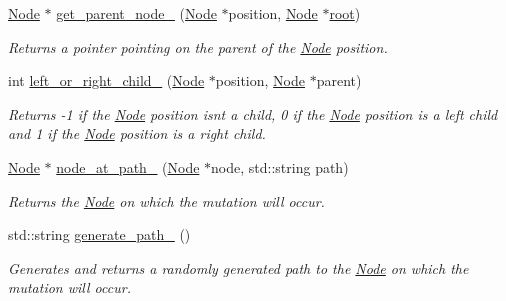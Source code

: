 \begin{DoxyCompactItemize}
\mbox{\label{classEvolution_ac22e226d32fe53774b437c51903816db}} 
\hyperlink{classNode}{Node} $\ast$ \hyperlink{classEvolution_ac22e226d32fe53774b437c51903816db}{get\+\_\+parent\+\_\+node\+\_\+} (\hyperlink{classNode}{Node} $\ast$position, \hyperlink{classNode}{Node} $\ast$\hyperlink{classEvolution_a83182c1db463268e933cc0ca9c46d056}{root})
\begin{DoxyCompactList}\small\item\em Returns a pointer pointing on the parent of the \hyperlink{classNode}{Node} position. \end{DoxyCompactList}\item 
\mbox{\label{classEvolution_a9d5f4998a7ec21ea2a2bec87b89d26ec}} 
int \hyperlink{classEvolution_a9d5f4998a7ec21ea2a2bec87b89d26ec}{left\+\_\+or\+\_\+right\+\_\+child\+\_\+} (\hyperlink{classNode}{Node} $\ast$position, \hyperlink{classNode}{Node} $\ast$parent)
\begin{DoxyCompactList}\small\item\em Returns -\/1 if the \hyperlink{classNode}{Node} position isn\textquotesingle{}t a child, 0 if the \hyperlink{classNode}{Node} position is a left child and 1 if the \hyperlink{classNode}{Node} position is a right child. \end{DoxyCompactList}\item 
\mbox{\label{classEvolution_a94143bdc521fa73e8f0fa94a017c5217}} 
\hyperlink{classNode}{Node} $\ast$ \hyperlink{classEvolution_a94143bdc521fa73e8f0fa94a017c5217}{node\+\_\+at\+\_\+path\+\_\+} (\hyperlink{classNode}{Node} $\ast$node, std\+::string path)
\begin{DoxyCompactList}\small\item\em Returns the \hyperlink{classNode}{Node} on which the mutation will occur. \end{DoxyCompactList}\item 
\mbox{\label{classEvolution_a983dff352ca0f1587db8b259a2e3ae67}} 
std\+::string \hyperlink{classEvolution_a983dff352ca0f1587db8b259a2e3ae67}{generate\+\_\+path\+\_\+} ()
\begin{DoxyCompactList}\small\item\em Generates and returns a randomly generated path to the \hyperlink{classNode}{Node} on which the mutation will occur. \end{DoxyCompactList}\item 

\end{DoxyCompactItemize}
